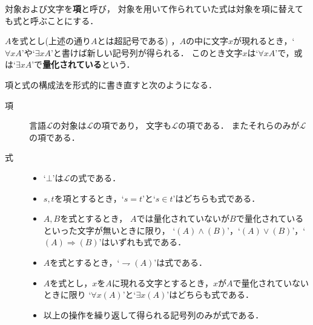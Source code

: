 	
	対象および文字を{\bf 項}と呼び，
	対象を用いて作られていた式は対象を項に替えても式と呼ぶことにする．
	
	$A$を式とし(上述の通り$A$とは超記号である)
	，$A$の中に文字$x$が現れるとき，`$\forall x A$'や`$\exists x A$'と書けば新しい記号列が得られる．
	このとき文字$x$は`$\forall x A$'で，或は`$\exists x A$'で{\bf 量化されている}という．
	
	項と式の構成法を形式的に書き直すと次のようになる．
	\begin{description}
		\item[項] 言語$\mathcal{L}$の対象は$\mathcal{L}$の項であり，
			文字も$\mathcal{L}$の項である．
			またそれらのみが$\mathcal{L}$の項である．
			
		\item[式] 
			\begin{itemize}
				\item `$\bot$'は$\mathcal{L}$の式である．
				
				\item $s,t$を項とするとき，`$s=t$'と`$s \in t$'はどちらも式である．
					
				\item $A,B$を式とするとき，
					$A$では量化されていないが$B$で量化されているといった文字が無いときに限り，
					`$(A) \wedge (B)$'，`$(A) \vee (B)$'，`$(A) \Longrightarrow (B)$'はいずれも式である．
				
				\item $A$を式とするとき，`$\rightharpoondown (A)$'は式である．
				
				\item $A$を式とし，$x$を$A$に現れる文字とするとき，$x$が$A$で量化されていないときに限り
					`$\forall x (A)$'と`$\exists x (A)$'はどちらも式である．
				
				\item 以上の操作を繰り返して得られる記号列のみが式である．
			\end{itemize}
	\end{description}
	
